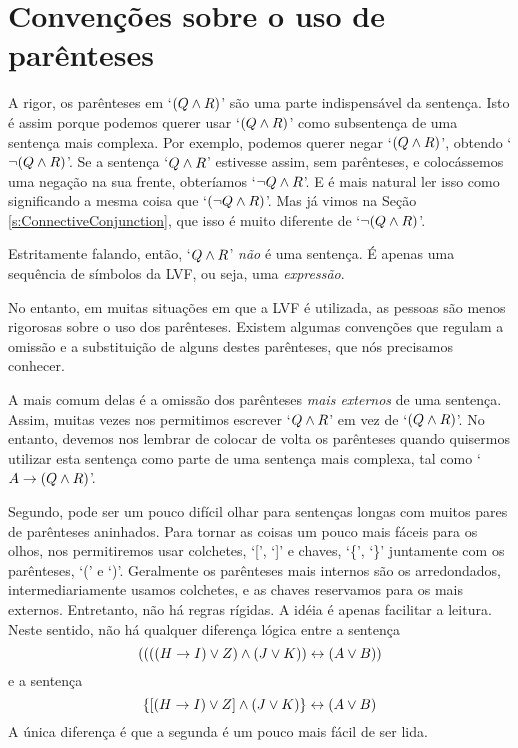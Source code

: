 \section{Convenções sobre o uso de parênteses}
\label{TFLconventions}
A rigor, os parênteses em `$(Q \wedge R)$' são uma parte indispensável da sentença.
Isto é assim porque podemos querer usar `$(Q \wedge R)$' como subsentença de uma sentença mais complexa.
Por exemplo, podemos querer negar `$(Q \wedge R)$', obtendo `$\neg(Q \wedge R)$'.
Se a sentença `$Q \wedge R$' estivesse assim, sem parênteses, e colocássemos uma negação na sua frente, obteríamos `$\neg Q \wedge R$'.
E é mais natural ler isso como significando a mesma coisa que `$(\neg Q \wedge R)$'.
Mas já vimos na Seção \ref{s:ConnectiveConjunction}, que isso é muito diferente de `$\neg(Q \wedge R)$'.

Estritamente falando, então, `$Q \wedge R$' \emph{não} é uma sentença.
É apenas uma sequência de símbolos da LVF, ou seja, uma \emph{expressão}.

No entanto, em muitas situações em que a LVF é utilizada, as pessoas são menos rigorosas sobre o uso dos parênteses.
Existem algumas convenções que regulam a omissão e a substituição de alguns destes parênteses, que nós precisamos conhecer.

A mais comum delas é a omissão dos parênteses \emph{mais externos} de uma sentença.
Assim, muitas vezes nos permitimos escrever `$Q \wedge R$' em vez de `$(Q \wedge R)$'.
No entanto, devemos nos lembrar de colocar de volta os parênteses quando quisermos utilizar esta sentença como parte de uma sentença mais complexa, tal como `$A \rightarrow (Q \wedge R)$'.

Segundo, pode ser um pouco difícil olhar para sentenças longas com muitos pares de parênteses aninhados.
Para tornar as coisas um pouco mais fáceis para os olhos, nos permitiremos usar colchetes, `[', `]' e chaves, `\{', `\}' juntamente com os parênteses, `(' e `)'.
Geralmente os parênteses mais internos são os arredondados, intermediariamente usamos colchetes, e as chaves reservamos para os mais externos.
Entretanto, não há regras rígidas.
A idéia é apenas facilitar a leitura.
Neste sentido, não há qualquer diferença lógica entre a sentença
$$((((H \rightarrow I) \vee Z) \wedge (J \vee K)) \leftrightarrow (A \vee B))$$
e a sentença
$$\{[(H \rightarrow I) \vee Z] \wedge (J \vee K)\} \leftrightarrow (A \vee B)$$
A única diferença é que a segunda é um pouco mais fácil de ser lida.


\practiceproblems

